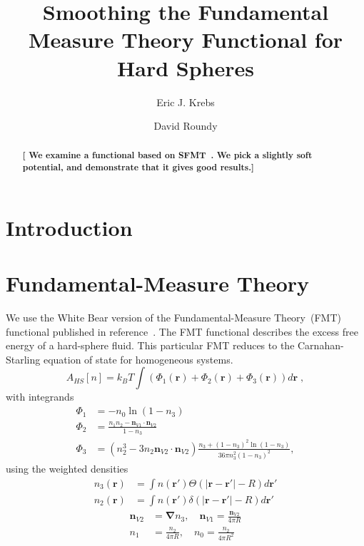 \documentclass[letterpaper,twocolumn,amsmath,amssymb,prb]{revtex4-1}
\newcommand{\red}[1]{{\bf \color{red} #1}}
\newcommand{\rr}{\textbf{r}}
\newcommand{\fixme}[1]{\red{[#1]}}
\begin{document}
\title{Smoothing the Fundamental Measure Theory Functional for Hard Spheres}

\author{Eric J. Krebs}

\author{David Roundy}

\begin{abstract}
\fixme{ We examine a functional based on SFMT~\cite{schmidt2000fluid}.
  We pick a slightly soft potential, and demonstrate that it gives
  good results.}
\end{abstract}

\maketitle

\section{Introduction}



\section{Fundamental-Measure Theory}

We use the White Bear version of the Fundamental-Measure Theory~(FMT)
functional published in reference~\cite{roth2002whitebear}.  The FMT
functional describes the excess free energy of a hard-sphere fluid.
This particular FMT reduces to the Carnahan-Starling equation of state
for homogeneous systems.
\begin{equation}
A_\textit{HS}[n] = k_B T \int \left(\Phi_1(\rr) + \Phi_2(\rr) + \Phi_3(\rr)\right) d\rr \; ,
\end{equation}
with integrands
\begin{align}
\Phi_1 &= -n_0 \ln\left( 1 - n_3\right)\\
\Phi_2 &= \frac{n_1 n_2 - \mathbf{n}_{V1} \cdot\mathbf{n}_{V2}}{1-n_3} \\
\Phi_3 &= (n_2^3 - 3 n_2 \mathbf{n}_{V2} \cdot \mathbf{n}_{V2}) \frac{
  n_3 + (1-n_3)^2 \ln(1-n_3)
}{
  36\pi n_3^2\left( 1 - n_3 \right)^2
} ,
\end{align}
using the weighted densities
\begin{align}
  n_3(\rr) &= \int n(\rr') \Theta(\left|\rr - \rr'\right| - R) d\rr' \\
  n_2(\rr) &= \int n(\rr') \delta(\left|\rr - \rr'\right| - R) d\rr'
\end{align}
\begin{align}
  \mathbf{n}_{V2} &= \mathbf{\nabla} n_3 , \quad
  \mathbf{n}_{V1} = \frac{\mathbf{n}_{V2}}{4\pi R} \\
  n_1 &= \frac{n_2}{4\pi R} , \quad
  n_0 = \frac{n_2}{4\pi R^2}
\end{align}
\end{document}
